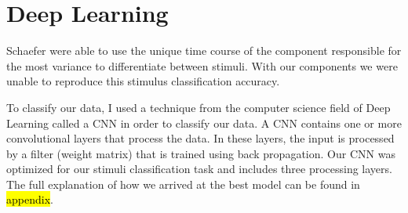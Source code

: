 \chapter{Deep Learning}
Schaefer \etal \citeyear{schaefer_name_2011} were able to use the unique time course of the component responsible for the most variance to differentiate between stimuli.
With our components we were unable to reproduce this stimulus classification accuracy. 
 
To classify our data, I used a technique from the computer science field of Deep Learning called a \ac{CNN} in order to classify our data.
A \ac{CNN} contains one or more convolutional layers that process the data.
In these layers, the input is processed by a filter (weight matrix) that is trained using back propagation. 
Our \ac{CNN} was optimized for our stimuli classification task and includes three processing layers.
The full explanation of how we arrived at the best model can be found in \hl{appendix}.

